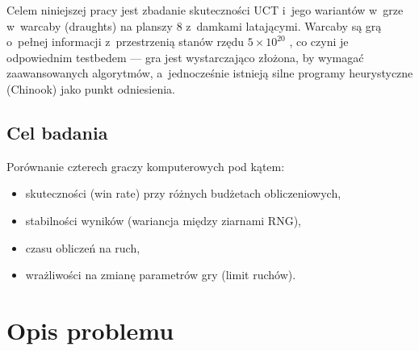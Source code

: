 \documentclass[12pt,a4paper]{article}
\begin{document}
Celem niniejszej pracy jest zbadanie skuteczności UCT i~jego wariantów w~grze w~warcaby (draughts) na planszy 8 z~damkami latającymi. Warcaby są grą o~pełnej informacji z~przestrzenią stanów rzędu $5 \times 10^{20}$ \cite{schaeffer2007checkers}, co czyni je odpowiednim testbedem — gra jest wystarczająco złożona, by wymagać zaawansowanych algorytmów, a~jednocześnie istnieją silne programy heurystyczne (Chinook) jako punkt odniesienia.

\subsection{Cel badania}
Porównanie czterech graczy komputerowych pod kątem:
\begin{itemize}[nosep]
  \item skuteczności (win rate) przy różnych budżetach obliczeniowych,
  \item stabilności wyników (wariancja między ziarnami RNG),
  \item czasu obliczeń na ruch,
  \item wrażliwości na zmianę parametrów gry (limit ruchów).
\end{itemize}

\section{Opis problemu}
\label{sec:problem}
\end{document}
